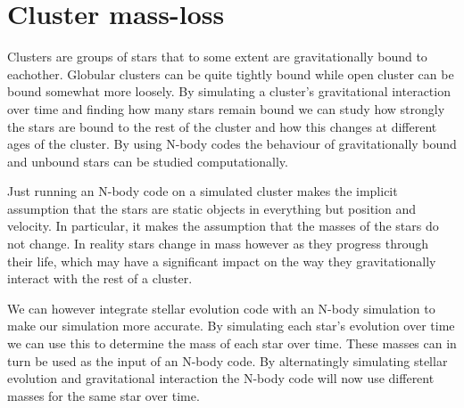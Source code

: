 \documentclass{aa}
\begin{document}
\section{Cluster mass-loss} \label{sec:massloss}
Clusters are groups of stars that to some extent are gravitationally bound to eachother. Globular clusters can be quite tightly bound while open cluster can be bound somewhat more loosely. By simulating a cluster's gravitational interaction over time and finding how many stars remain bound we can study how strongly the stars are bound to the rest of the cluster and how this changes at different ages of the cluster. By using N-body codes the behaviour of gravitationally bound and unbound stars can be studied computationally.

Just running an N-body code on a simulated cluster makes the implicit assumption that the stars are static objects in everything but position and velocity. In particular, it makes the assumption that the masses of the stars do not change. In reality stars change in mass however as they progress through their life, which may have a significant impact on the way they gravitationally interact with the rest of a cluster.

We can however integrate stellar evolution code with an N-body simulation to make our simulation more accurate. By simulating each star's evolution over time we can use this to determine the mass of each star over time. These masses can in turn be used as the input of an N-body code. By alternatingly simulating stellar evolution and gravitational interaction the N-body code will now use different masses for the same star over time.
\end{document}
